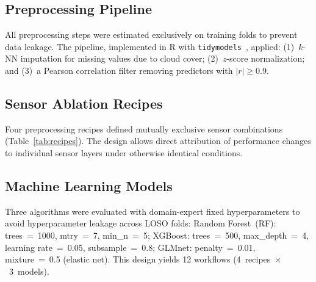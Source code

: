 \documentclass[lettersize,journal]{IEEEtran}
\begin{document}
\subsection{Preprocessing Pipeline}

All preprocessing steps were estimated exclusively on training folds to
prevent data leakage. The pipeline, implemented in R with
\texttt{tidymodels}~\cite{ref15}, applied: (1)~$k$-NN imputation for missing
values due to cloud cover; (2)~$z$-score normalization; and (3)~a Pearson
correlation filter removing predictors with $|r| \geq 0.9$.

\subsection{Sensor Ablation Recipes}

Four preprocessing recipes defined mutually exclusive sensor combinations
(Table~\ref{tab:recipes}). The design allows direct attribution of performance
changes to individual sensor layers under otherwise identical conditions.

\begin{table}[!t]
\caption{Sensor Ablation Recipes Used in the LOSO Study\label{tab:recipes}}
\centering
{}
\end{table}

\subsection{Machine Learning Models}

Three algorithms were evaluated with domain-expert fixed hyperparameters
to avoid hyperparameter leakage across LOSO folds:
Random Forest~(RF): trees~=~1000, mtry~=~7, min\_n~=~5;
XGBoost: trees~=~500, max\_depth~=~4, learning rate~=~0.05, subsample~=~0.8;
GLMnet: penalty~=~0.01, mixture~=~0.5 (elastic net).
This design yields 12 workflows (4~recipes~$\times$~3~models).
\end{document}
